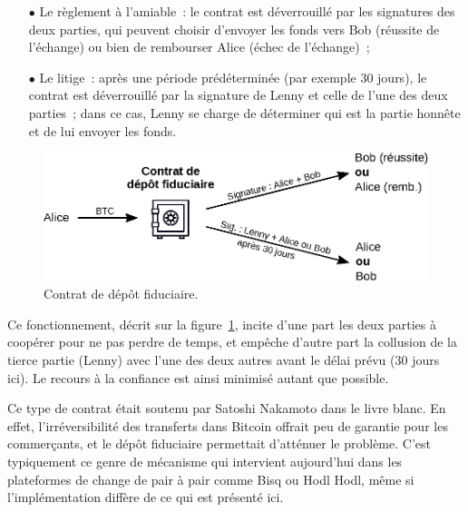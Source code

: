 \begin{itemize}
\item[$\bullet$] Le règlement à l'amiable~: le contrat est déverrouillé par les signatures des deux parties, qui peuvent choisir d'envoyer les fonds vers Bob (réussite de l'échange) ou bien de rembourser Alice (échec de l'échange)~;
\item[$\bullet$] Le litige~: après une période prédéterminée (par exemple 30 jours), le contrat est déverrouillé par la signature de Lenny et celle de l'une des deux parties~; dans ce cas, Lenny se charge de déterminer qui est la partie honnête et de lui envoyer les fonds.
\end{itemize}

\begin{figure}[ht]
  \centering
  \includegraphics[scale=0.9]{img/escrow-contract.eps}
  \caption{Contrat de dépôt fiduciaire.}
  \label{fig:escrow-contract}
\end{figure}

Ce fonctionnement, décrit sur la figure~\ref{fig:escrow-contract}, incite d'une part les deux parties à coopérer pour ne pas perdre de temps, et empêche d'autre part la collusion de la tierce partie (Lenny) avec l'une des deux autres avant le délai prévu (30 jours ici). Le recours à la confiance est ainsi minimisé autant que possible.

Ce type de contrat était soutenu par Satoshi Nakamoto dans le livre blanc. En effet, l'irréversibilité des transferts dans Bitcoin offrait peu de garantie pour les commerçants, et le dépôt fiduciaire permettait d'atténuer le problème. C'est typiquement ce genre de mécanisme qui intervient aujourd'hui dans les plateformes de change de pair à pair comme Bisq ou Hodl Hodl, même si l'implémentation diffère de ce qui est présenté ici.

